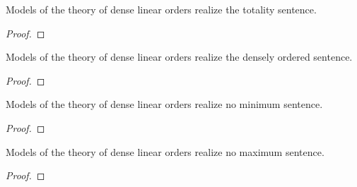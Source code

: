 \begin{lemma}
    \label{lem:realize-total}
    \leanok
    Models of the theory of dense linear orders realize the totality sentence.
\end{lemma}
\begin{proof}
    \leanok
\end{proof}

\begin{lemma}
    \label{lem:realize-densely-ordered}
    \leanok
    Models of the theory of dense linear orders realize the densely ordered sentence.
\end{lemma}
\begin{proof}
    \leanok
\end{proof}

\begin{lemma}
    \label{lem:realize-no-min}
    \leanok
    Models of the theory of dense linear orders realize no minimum sentence.
\end{lemma}
\begin{proof}
    \leanok
\end{proof}

\begin{lemma}
    \label{lem:realize-no-max}
    \leanok
    Models of the theory of dense linear orders realize no maximum sentence.
\end{lemma}
\begin{proof}
    \leanok
\end{proof}




